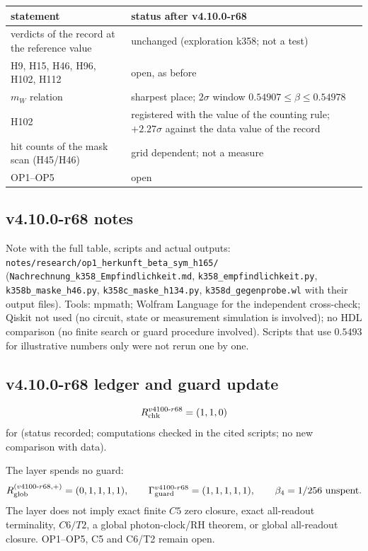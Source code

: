 \begin{center}
\small
\begin{tabular}{@{}>{\raggedright\arraybackslash}p{}>{\raggedright\arraybackslash}p{}@{}}
\toprule
statement & status after v4.10.0-r68\\
\midrule
verdicts of the record at the reference value & unchanged (exploration k358; not a test)\\
H9, H15, H46, H96, H102, H112 & open, as before\\
\(m_W\) relation & sharpest place; \(2\sigma\) window \(0.54907\le\beta\le0.54978\)\\
H102 & registered with the value of the counting rule; \(+2.27\sigma\) against the data value of the record\\
hit counts of the mask scan (H45/H46) & grid dependent; not a measure\\
OP1--OP5 & open\\
\bottomrule
\end{tabular}
\end{center}

\subsection*{v4.10.0-r68 notes}
\label{subsec:v4100-r68-notes}

{\raggedright
Note with the full table, scripts and actual outputs:
\texttt{notes/\allowbreak research/\allowbreak op1\_\allowbreak herkunft\_\allowbreak beta\_\allowbreak sym\_\allowbreak h165/}
(\texttt{Nachrechnung\_\allowbreak k358\_\allowbreak Empfindlichkeit.md}, \texttt{k358\_\allowbreak empfindlichkeit.py},
\texttt{k358b\_\allowbreak maske\_\allowbreak h46.py}, \texttt{k358c\_\allowbreak maske\_\allowbreak h134.py},
\texttt{k358d\_\allowbreak gegenprobe.wl} with their output files).
Tools: mpmath; Wolfram Language for the independent cross-check; Qiskit not used (no circuit, state or measurement simulation is involved);
no HDL comparison (no finite search or guard procedure involved).  Scripts that use \(0.5493\) for illustrative numbers only were not rerun
one by one.
\par}

\subsection*{v4.10.0-r68 ledger and guard update}
\label{subsec:v4100-r68-ledger-guard}

\[
R_{\rm chk}^{v4100\text{-}r68}=(1,1,0)
\]
for (status recorded; computations checked in the cited scripts; no new comparison with data).

The layer spends no guard:
\[
R_{\rm glob}^{(v4100\text{-}r68,+)}=(0,1,1,1,1),
\qquad
\Gamma_{\rm guard}^{v4100\text{-}r68}=(1,1,1,1,1),
\qquad
\beta_4=1/256\ \text{unspent}.
\]
The layer does not imply exact finite \(C5\) zero closure, exact all-readout terminality, \(C6/T2\), a global photon-clock/RH theorem,
or global all-readout closure.  OP1--OP5, C5 and C6/T2 remain open.
